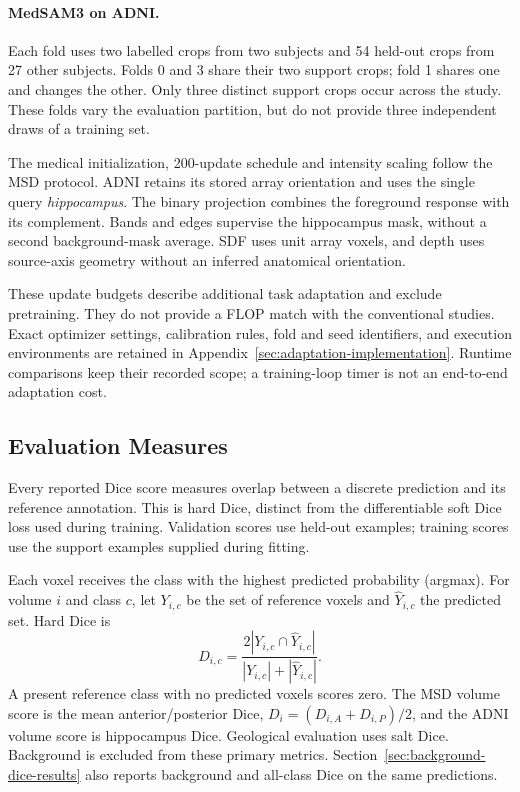 \paragraph{MedSAM3 on ADNI.}\label{sec:medsam-adni-methods}
Each fold uses two labelled crops from two subjects and 54 held-out
crops from 27 other subjects. Folds 0 and 3 share their two support
crops; fold 1 shares one and changes the other. Only three distinct
support crops occur across the study. These folds vary the evaluation
partition, but do not provide three independent draws of a training set.

The medical initialization, 200-update schedule and intensity scaling
follow the MSD protocol. ADNI retains its stored array orientation and
uses the single query \emph{hippocampus}. The binary projection combines
the foreground response with its complement. Bands and edges supervise
the hippocampus mask, without a second background-mask average.
SDF uses unit array voxels, and depth uses source-axis geometry without
an inferred anatomical orientation.

These update budgets describe additional task adaptation and exclude
pretraining. They do not provide a FLOP match with the conventional
studies. Exact optimizer settings, calibration rules, fold and seed
identifiers, and execution environments are retained in
Appendix~\ref{sec:adaptation-implementation}. Runtime comparisons keep
their recorded scope; a training-loop timer is not an end-to-end
adaptation cost.

\subsection{Evaluation Measures}
\label{sec:evaluation-methods}

Every reported Dice score measures overlap between a discrete
prediction and its reference annotation. This is hard Dice, distinct
from the differentiable soft Dice loss used during training.
Validation scores use held-out examples; training scores use the
support examples supplied during fitting.

Each voxel receives the class with the highest predicted probability
(argmax). For volume $i$ and class $c$, let $Y_{i,c}$ be the set of
reference voxels and $\widehat Y_{i,c}$ the predicted set. Hard Dice is
\begin{equation}
 D_{i,c}=\frac{2|Y_{i,c}\cap\widehat Y_{i,c}|}
 {|Y_{i,c}|+|\widehat Y_{i,c}|}.
\label{eq:reported-hard-dice}
\end{equation}
A present reference class with no predicted voxels scores zero.
The MSD volume score is the mean anterior/posterior Dice,
$D_i=(D_{i,A}+D_{i,P})/2$, and the ADNI volume score is hippocampus Dice. Geological evaluation
uses salt Dice.
Background is excluded from these primary metrics.
Section~\ref{sec:background-dice-results} also reports background and
all-class Dice on the same predictions.

